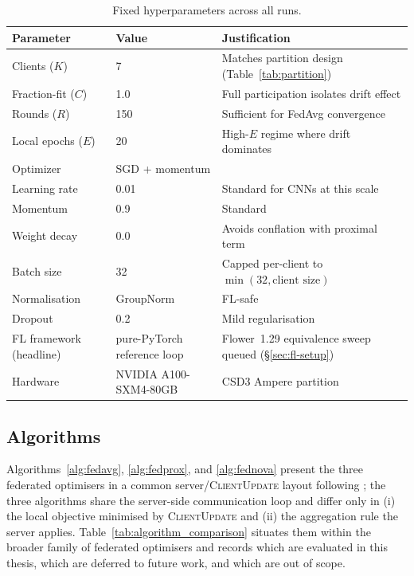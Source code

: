 \documentclass[11pt,a4paper]{article}
\begin{document}
\begin{table}[!htbp]
\centering
\small
\begin{tabular}{lll}
\toprule
Parameter & Value & Justification \\
\midrule
Clients ($K$)               & 7         & Matches partition design (Table~\ref{tab:partition}) \\
Fraction-fit ($C$)          & 1.0       & Full participation isolates drift effect \\
Rounds ($R$)                & 150       & Sufficient for FedAvg convergence \\
Local epochs ($E$)          & 20        & High-$E$ regime where drift dominates \\
Optimizer                   & SGD + momentum & \citet{mcmahan2017fedavg} \\
Learning rate               & 0.01      & Standard for CNNs at this scale \\
Momentum                    & 0.9       & Standard \\
Weight decay                & 0.0       & Avoids conflation with proximal term \\
Batch size                  & 32        & Capped per-client to $\min(32, \text{client size})$ \\
Normalisation               & GroupNorm & FL-safe \citep{hsieh2020quagmire} \\
Dropout                     & 0.2       & Mild regularisation \\
FL framework (headline)     & pure-PyTorch reference loop & Flower~1.29 equivalence sweep queued (\S\ref{sec:fl-setup}) \\
Hardware                    & NVIDIA A100-SXM4-80GB & CSD3 Ampere partition \\
\bottomrule
\end{tabular}
\caption{Fixed hyperparameters across all runs.}
\label{tab:hyperparams}
\end{table}

\subsection{Algorithms}\label{sec:algorithms}

Algorithms~\ref{alg:fedavg}, \ref{alg:fedprox}, and \ref{alg:fednova}
present the three federated optimisers in a common
server/\textsc{ClientUpdate} layout following \citet{mcmahan2017fedavg};
the three algorithms share the server-side communication loop and differ
only in (i) the local objective minimised by \textsc{ClientUpdate} and
(ii) the aggregation rule the server applies.
Table~\ref{tab:algorithm_comparison} situates them within the broader
family of federated optimisers and records which are evaluated in this
thesis, which are deferred to future work, and which are out of scope.
\end{document}
